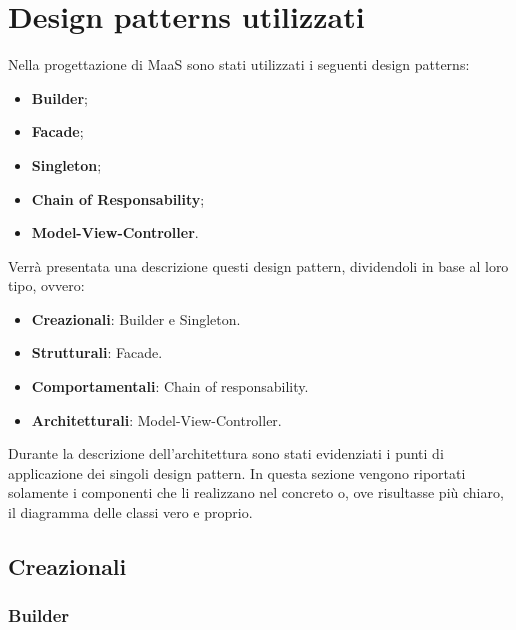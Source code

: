 \newpage
\section{Design patterns utilizzati}
Nella progettazione di MaaS sono stati utilizzati i seguenti design patterns:
\begin{itemize}
\item \textbf{Builder};
\item \textbf{Facade};
\item \textbf{Singleton};
\item \textbf{Chain of Responsability};
\item \textbf{Model-View-Controller}.
\end{itemize}
Verrà presentata una descrizione questi design pattern, dividendoli in base al loro tipo, ovvero:
\begin{itemize}
\item \textbf{Creazionali}: Builder e Singleton.
\item \textbf{Strutturali}: Facade.
\item \textbf{Comportamentali}: Chain of responsability.
\item \textbf{Architetturali}: Model-View-Controller.
\end{itemize}
Durante la descrizione dell'architettura sono stati evidenziati i punti di applicazione dei singoli design pattern. In questa sezione vengono riportati solamente i componenti che li realizzano nel concreto o, ove risultasse più chiaro, il diagramma delle classi vero e proprio.
\subsection{Creazionali}
\subsubsection{Builder}

